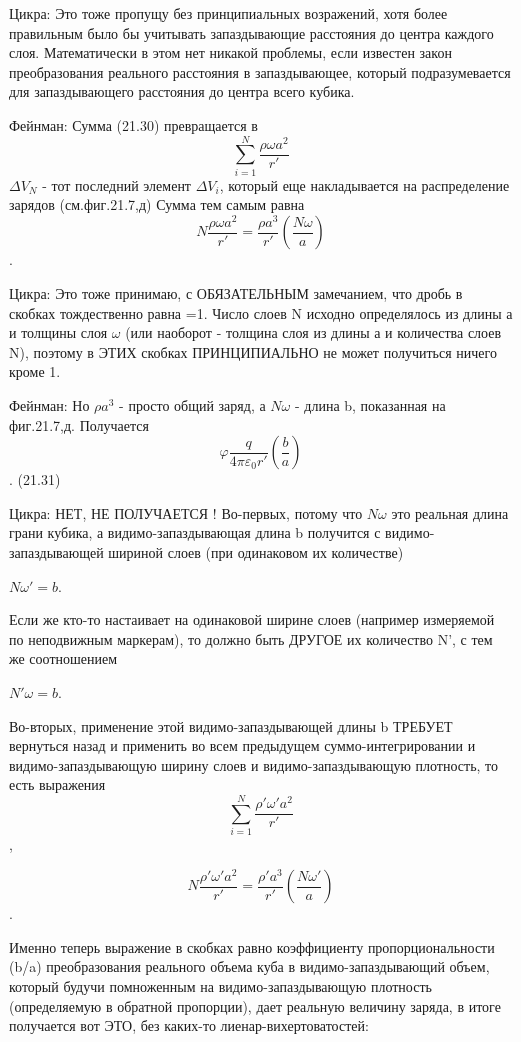 \documentclass{article}
\begin{document}
Цикра:
Это тоже пропущу без принципиальных возражений, хотя более правильным было бы учитывать запаздывающие расстояния до центра каждого слоя. Математически в этом нет никакой проблемы, если известен закон преобразования реального расстояния в запаздывающее, который подразумевается для запаздывающего расстояния до центра всего кубика.

Фейнман:
Сумма (21.30) превращается в 
$$\sum\limits_{i=1}^N \frac{\rho \omega a^2}{r'}$$
$\Delta V_N$ - тот последний элемент $\Delta V_i$, который еще накладывается на распределение зарядов (см.фиг.21.7,д)
Сумма тем самым равна
$$N\frac{\rho \omega a^2}{r'}=\frac{\rho a^3}{r'}\left (\frac{N\omega}{a}\right )$$.

Цикра:
Это тоже принимаю, с ОБЯЗАТЕЛЬНЫМ замечанием, что дробь в скобках тождественно равна =1.
Число слоев N исходно определялось из длины $а$ и толщины слоя $\omega$ (или наоборот - толщина слоя из длины а и количества слоев N), поэтому в ЭТИХ скобках ПРИНЦИПИАЛЬНО не может получиться ничего кроме 1.


Фейнман:
Но $\rho a^3$ - просто общий заряд, а  $N\omega$ - длина b, показанная на фиг.21.7,д.
Получается
$$\varphi\frac{q}{4\pi\varepsilon_0 r'}\left( \frac{b}{a}\right )$$  .   (21.31)

Цикра:
НЕТ, НЕ ПОЛУЧАЕТСЯ !
Во-первых, потому что $N\omega$ это реальная длина грани кубика, а видимо-запаздывающая длина b получится с видимо-запаздывающей шириной слоев (при одинаковом их количестве)

 $N\omega'=b$.

Если же кто-то настаивает на одинаковой ширине слоев (например измеряемой по неподвижным маркерам), то должно быть ДРУГОЕ их количество N', с тем же соотношением

$N'\omega=b$.

Во-вторых, применение этой видимо-запаздывающей длины b  ТРЕБУЕТ вернуться  назад и применить во всем предыдущем суммо-интегрировании и видимо-запаздывающую ширину слоев и видимо-запаздывающую плотность, то есть выражения
$$\sum\limits_{i=1}^N \frac{\rho' \omega' a^2}{r'}$$,

$$N\frac{\rho' \omega' a^2}{r'}=\frac{\rho' a^3}{r'}\left (\frac{N\omega'}{a}\right )$$.

Именно теперь выражение в скобках равно коэффициенту пропорциональности (b/a) преобразования реального объема куба в видимо-запаздывающий объем, который будучи помноженным на видимо-запаздывающую плотность (определяемую в обратной пропорции), дает реальную величину заряда, в итоге получается вот ЭТО, без каких-то лиенар-вихертоватостей:
\end{document}
